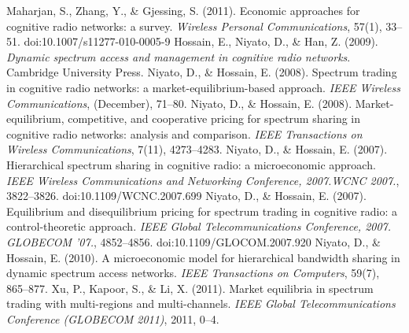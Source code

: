 \begin{thebibliography}{}
 Maharjan, S., Zhang, Y., \& Gjessing, S. (2011). Economic approaches for cognitive radio networks: a survey. \textit{Wireless Personal Communications}, 57(1), 33–51. doi:10.1007/s11277-010-0005-9
 Hossain, E., Niyato, D., \& Han, Z. (2009). \textit{Dynamic spectrum access and management in cognitive radio networks}. Cambridge University Press.
 Niyato, D., \& Hossain, E. (2008). Spectrum trading in cognitive radio networks: a market-equilibrium-based approach.\textit{ IEEE Wireless Communications}, (December), 71–80.
 Niyato, D., \& Hossain, E. (2008). Market-equilibrium, competitive, and cooperative pricing for spectrum sharing in cognitive radio networks: analysis and comparison. \textit{IEEE Transactions on Wireless Communications}, 7(11), 4273–4283. 
 Niyato, D., \& Hossain, E. (2007). Hierarchical spectrum sharing in cognitive radio: a microeconomic approach. \textit{IEEE Wireless Communications and Networking Conference, 2007.WCNC 2007.}, 3822–3826. doi:10.1109/WCNC.2007.699
 Niyato, D., \& Hossain, E. (2007). Equilibrium and disequilibrium pricing for spectrum trading in cognitive radio: a control-theoretic approach. \textit{IEEE Global Telecommunications Conference, 2007. GLOBECOM  ’07.}, 4852–4856. doi:10.1109/GLOCOM.2007.920
 Niyato, D., \& Hossain, E. (2010). A microeconomic model for hierarchical bandwidth sharing in dynamic spectrum access networks. \textit{IEEE Transactions on Computers}, 59(7), 865–877.
 Xu, P., Kapoor, S., \& Li, X. (2011). Market equilibria in spectrum trading with multi-regions and multi-channels. \textit{IEEE Global Telecommunications Conference (GLOBECOM 2011)}, 2011, 0–4.


\end{thebibliography}
